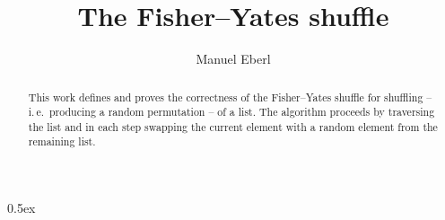 \documentclass[11pt,a4paper]{article}
\begin{document}
\title{The Fisher--Yates shuffle}
\author{Manuel Eberl}
\maketitle

\begin{abstract}
This work defines and proves the correctness of the Fisher--Yates shuffle for shuffling -- i.\,e.\ producing a random permutation -- of a list. 
The algorithm proceeds by traversing the list and in each step swapping the current element with a random element from the remaining list.
\end{abstract}

\tableofcontents

\parindent 0pt\parskip 0.5ex

\newpage


%
%
\end{document}
